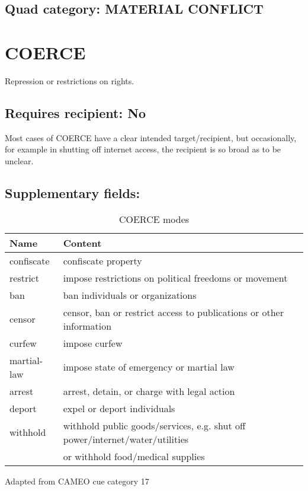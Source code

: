 \documentclass[11pt]{report}
\newcommand{\plcat}[1]{\textsf{#1}}
\begin{document}
 
\subsection{Quad category: MATERIAL CONFLICT}

\newpage  

\section{COERCE}

Repression or restrictions on rights.

\subsection{Requires recipient: No}

Most cases of \plcat{COERCE} have a clear intended target/recipient, but occasionally, for example in shutting off internet access, the recipient is so broad as to be unclear. 

\subsection{Supplementary fields: }

\begin{table}[htp]
\caption{COERCE modes}
\begin{center}
\begin{tabular}{|l|l|}
\hline
Name & Content \\
\hline
confiscate & confiscate property \\
restrict & impose restrictions on political freedoms or movement \\
ban & ban individuals or organizations \\
censor & censor, ban or restrict access to publications or other information  \\
curfew & impose curfew \\
martial-law & impose state of emergency or martial law \\
arrest & arrest, detain, or charge with legal action \\
deport & expel or deport individuals \\
withhold & withhold public goods/services, e.g. shut off power/internet/water/utilities \\&or withhold food/medical supplies \\
\hline
\end{tabular}
\end{center}
\label{tab:coerce}
Adapted from CAMEO cue category 17
\end{table}%
\end{document}
